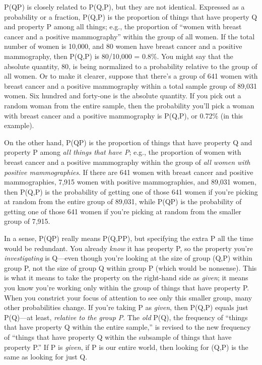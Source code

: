 {
 P(Q{\textbar}P) is closely related to P(Q,P), but they are not
identical. Expressed as a probability or a fraction, P(Q,P) is the
proportion of things that have property Q and property P among all
things; e.g., the proportion of ``women with breast
cancer and a positive mammography'' within the group
of all women. If the total number of women is 10,000, and 80 women have
breast cancer and a positive mammography, then P(Q,P) is 80/10,000 =
0.8\%. You might say that the absolute quantity, 80, is being
normalized to a probability relative to the group of all women. Or to
make it clearer, suppose that there's a group of 641
women with breast cancer and a positive mammography within a total
sample group of 89,031 women. Six hundred and forty-one is the absolute
quantity. If you pick out a random woman from the entire sample, then
the probability you'll pick a woman with breast cancer
and a positive mammography is P(Q,P), or 0.72\% (in this example).}

{
 On the other hand, P(Q{\textbar}P) is the proportion of things
that have property Q and property P among \textit{all things that have
P}; e.g., the proportion of women with breast cancer and a positive
mammography within the group of \textit{all women with positive
mammographies}. If there are 641 women with breast cancer and positive
mammographies, 7,915 women with positive mammographies, and 89,031
women, then P(Q,P) is the probability of getting one of those 641 women
if you're picking at random from the entire group of
89,031, while P(Q{\textbar}P) is the probability of getting one of
those 641 women if you're picking at random from the
smaller group of 7,915.}

{
 In a sense, P(Q{\textbar}P) really means P(Q,P{\textbar}P), but
specifying the extra P all the time would be redundant. You already
\textit{know} it has property P, so the property you're
\textit{investigating} is Q---even though you're
looking at the size of group (Q,P) within group P, not the size of
group Q within group P (which would be nonsense). This is what it means
to take the property on the right-hand side as \textit{given}; it means
you know you're working only within the group of things
that have property P. When you constrict your focus of attention to see
only this smaller group, many other probabilities change. If
you're taking P as \textit{given}, then P(Q,P) equals
just P(Q)---at least, \textit{relative to the group P}. The
\textit{old} P(Q), the frequency of ``things that have
property Q within the entire sample,'' is revised to
the new frequency of ``things that have property Q
within the subsample of things that have property
P.'' If P is \textit{given}, if P is our entire
world, then looking for (Q,P) is the same as looking for just Q.}

